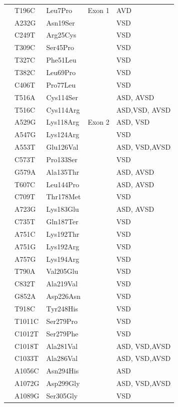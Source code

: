 \begin{refsection}
\begin{spacing}{1}
\begin{longtable}{P{0.75in} P{0.9in} P{0.85in} P{1.2in} p{1.3in}}
	 & T196C & Leu7Pro & Exon 1 & AVD \\ 
	 & A232G & Asn19Ser &  & VSD \\ 
	 & C249T & Arg25Cys &  & VSD \\ 
	 & T309C & Ser45Pro &  & VSD \\ 
	 & T327C & Phe51Leu &  & VSD \\ 
	 & T382C & Leu69Pro &  & VSD \\ 
	 & C406T & Pro77Leu &  & VSD \\ 
	 & T516A & Cys114Ser &  & ASD, AVSD \\ 
	 & T516C & Cys114Arg &  & ASD,VSD, AVSD \\ 
	 & A529G & Lys118Arg & Exon 2 & ASD, VSD \\ 
	 & A547G & Lys124Arg &  & VSD \\ 
	 & A553T & Glu126Val &  & ASD, VSD,AVSD \\ 
	  & C573T & Pro133Ser &  & VSD \\ 
	 & G579A & Ala135Thr &  & ASD, AVSD \\ 
	 & T607C & Leu144Pro &  & ASD, AVSD \\ 
	 & C709T & Thr178Met &  & VSD \\ 
	 & A723G & Lys183Glu &  & ASD, AVSD \\ 
	 & C735T & Gln187Ter &  & VSD \\ 
	 & A751C & Lys192Thr &  & VSD \\ 
	 & A751G & Lys192Arg &  & VSD \\ 
	 & A757G & Lys194Arg &  & VSD \\ 
	 & T790A & Val205Glu &  & VSD \\ 
	 & C832T & Ala219Val &  & VSD \\ 
	 & G852A & Asp226Asn &  & VSD \\ 
	 & T918C & Tyr248His &  & VSD \\ 
	 & T1011C & Ser279Pro &  & VSD \\ 
	 & C1012T & Ser279Phe &  & VSD \\ 
	 & C1018T & Ala281Val &  & ASD, VSD,AVSD \\ 
	 & C1033T & Ala286Val &  & ASD, VSD,AVSD \\ 
	 & A1056C & Asn294His &  & ASD \\ 
	 & A1072G & Asp299Gly &  & ASD, VSD,AVSD \\ 
	 & A1089G & Ser305Gly &  & VSD \\ 

\end{longtable}
\end{spacing}
\end{refsection}
